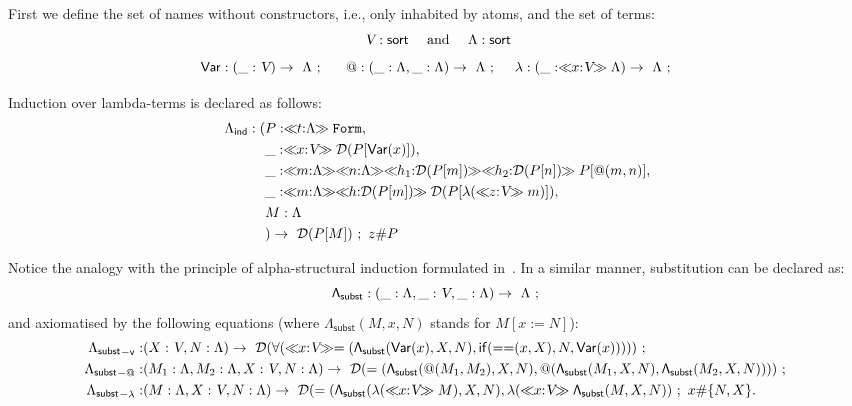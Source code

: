 \documentclass[copyright,creativecommons]{eptcs}
\newcounter{s}
\newcommand{\dabsort}[3]{\ensuremath{\ll\!\!\ntyping{#1}{#2}\!\!\gg #3}}
\newcommand{\concr}[2]{#1[#2]}
\newcommand{\typing}[2]{\ensuremath{#1 : #2}}
\newcommand{\ntyping}[2]{\ensuremath{#1{:}#2}}
\newcommand{\fresh}[2]{#1 \# #2}
\newcommand{\sort}{\ensuremath{\mathsf{sort}}}
\newcommand{\fconstrdecl}[4]{\ensuremath{#1 : #2 \rightarrow\ #3\ ;\ #4}}
\newcommand{\form}{\texttt{Form}}
\newcommand{\prf}{\ensuremath{\mathcal{D}}}
\newcommand{\name}{\textsl{V}}
\begin{document}
First we define the set of names without constructors, i.e., only inhabited by atoms, and
the set of terms:
\[\typing{\name}{\sort} \quad \text{ and }\quad \typing{\Lambda}{\sort}
\]
\begingroup
\small
\[%
\fconstrdecl{\mathsf{Var}}{(\typing{\_}{\name})}{\Lambda}{}\
\quad \fconstrdecl{@}{(\typing{\_}{\Lambda},\typing{\_}{\Lambda})}{\Lambda}{} 
\quad \fconstrdecl{\lambda}{(\typing{\_}{\dabsort{x}{\name}{\Lambda}})}{\Lambda}{}
\]
\endgroup

Induction over lambda-terms is declared as follows:
\[
\begin{aligned}\fconstrdecl{\Lambda_{\mathsf{ind}}}
{(\typing{&P}{\dabsort{t}{\Lambda}{\form}},\\
&\typing{\_}{\dabsort{x}{\name}{\prf{(\concr{P}{\mathsf{Var}(x)})}}},\\
&\typing{\_}{\dabsort{m}{\Lambda}
            {\dabsort{n}{\Lambda}
            {\dabsort{h_1}{\prf(\concr{P}{m})}}
            {\dabsort{h_2}{\prf(\concr{P}{n})}}
            \concr{P}{@(m,n)}
            }},\\
&\typing{\_}{\dabsort{m}{\Lambda}
            {\dabsort{h}{\prf{(\concr{P}{m})}}
            {\prf{(\concr{P}{\lambda(\dabsort{z}{\name}{m})})}}
            }},\\
&\typing{M}{\Lambda}\\
&)}{\prf{(\concr{P}{M}})}{\fresh{z}{P}}
\end{aligned}
\]

Notice the analogy with the principle of alpha-structural induction formulated in~\cite{pitts:alpsri}. In a similar manner,
substitution can be declared as:
\newcommand{\Lamsubst}{\Lambda_{\mathsf{subst}}}
\[\fconstrdecl{\mathsf{\Lamsubst}}{(\typing{\_}{\Lambda},\typing{\_}{\name},\typing{\_}{\Lambda})}{\Lambda}{}\]
%
and axiomatised by the following equations (where $\Lamsubst(M, x, N)$ stands for  $M[x := N]$):
\begingroup
\small
\[
\begin{aligned}
\fconstrdecl{{\Lamsubst}_{\mathsf{-v}}}{&(\typing{X}{\name},\typing{N}{\Lambda})}
{\prf{(\mathsf{\forall}(
                         \dabsort{x}{\name}
                         {=( 
                             \mathsf{\Lamsubst}(\mathsf{Var}(x), X, N),
                             \mathsf{if}(\mathsf{==}(x, X),N,\mathsf{Var}(x))
                            )}))}}
{}    
\\
\fconstrdecl{{\Lamsubst}_{-@}}{&(\typing{M_{1}}{\Lambda}, \typing{M_{2}}{\Lambda}, \typing{X}{\name},\typing{N}{\Lambda})}
{\prf{(=(\mathsf{\Lamsubst}(@(M_{1}, M_{2}) , X, N),
                   @(\mathsf{\Lamsubst}(M_{1}, X, N), 
                     \mathsf{\Lamsubst}(M_{2}, X, N))   
                  ))}}
{}
\\
\fconstrdecl{{\Lamsubst}_{-\lambda}}{&(\typing{M}{\Lambda}, \typing{X}{\name},\typing{N}{\Lambda})}
{\prf{(=(\mathsf{\Lamsubst}(\lambda(\dabsort{x}{\name}{M}), X, N),
\lambda(\dabsort{x}{\name}{\mathsf{\Lamsubst}(M, X, N))}}}
{\fresh{x}{\{N, X\}}}.
\end{aligned}
\]
\endgroup
\end{document}
